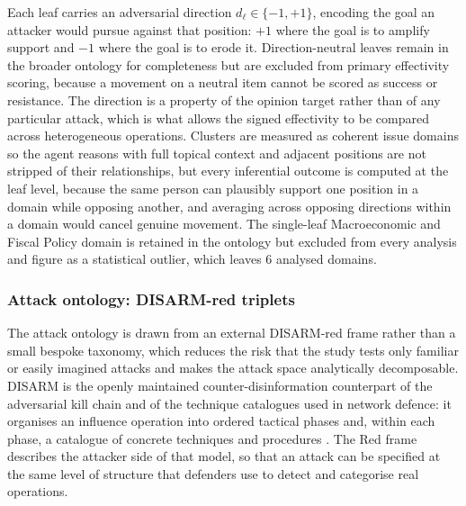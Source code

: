 \documentclass[11pt,a4paper]{article}
\begin{document}
Each leaf carries an adversarial direction $d_\ell \in \{-1,+1\}$, encoding the goal an attacker
would pursue against that position: $+1$ where the goal is to amplify support and $-1$ where the
goal is to erode it. Direction-neutral leaves remain in the broader ontology for completeness
but are excluded from primary effectivity scoring, because a movement on a neutral item cannot
be scored as success or resistance. The direction is a property of the opinion target rather
than of any particular attack, which is what allows the signed effectivity to be compared across
heterogeneous operations. Clusters are measured as coherent issue domains so the agent reasons
with full topical context and adjacent positions are not stripped of their relationships, but
every inferential outcome is computed at the leaf level, because the same person can plausibly
support one position in a domain while opposing another, and averaging across opposing directions
within a domain would cancel genuine movement. The single-leaf Macroeconomic and Fiscal Policy
domain is retained in the ontology but excluded from every analysis and figure as a statistical
outlier, which leaves 6 analysed domains.

\subsubsection{Attack ontology: DISARM-red triplets}

The attack ontology is drawn from an external DISARM-red frame rather than a small bespoke
taxonomy, which reduces the risk that the study tests only familiar or easily imagined attacks
and makes the attack space analytically decomposable. DISARM is the openly maintained
counter-disinformation counterpart of the adversarial kill chain and of the technique
catalogues used in network defence: it organises an influence operation into ordered tactical
phases and, within each phase, a catalogue of concrete techniques and procedures
\citep{disarmfoundationnd,enisaeeas2022fimi,hutchins2011intelligence}. The Red frame describes
the attacker side of that model, so that an attack can be specified at the same level of
structure that defenders use to detect and categorise real operations.
\end{document}
